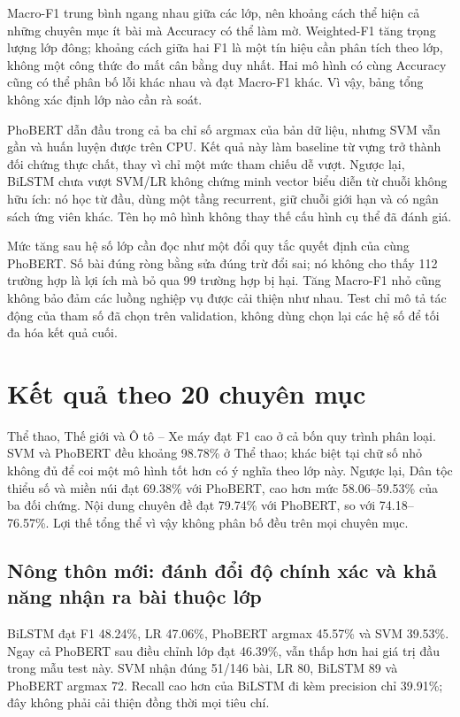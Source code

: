 Macro-F1 trung bình ngang nhau giữa các lớp, nên khoảng cách thể hiện cả những chuyên mục ít bài mà Accuracy có thể làm mờ. Weighted-F1 tăng trọng lượng lớp đông; khoảng cách giữa hai F1 là một tín hiệu cần phân tích theo lớp, không một công thức đo mất cân bằng duy nhất. Hai mô hình có cùng Accuracy cũng có thể phân bố lỗi khác nhau và đạt Macro-F1 khác. Vì vậy, bảng tổng không xác định lớp nào cần rà soát.

PhoBERT dẫn đầu trong cả ba chỉ số argmax của bản dữ liệu, nhưng SVM vẫn gần và huấn luyện được trên CPU. Kết quả này làm baseline từ vựng trở thành đối chứng thực chất, thay vì chỉ một mức tham chiếu dễ vượt. Ngược lại, BiLSTM chưa vượt SVM/LR không chứng minh vector biểu diễn từ chuỗi không hữu ích: nó học từ đầu, dùng một tầng recurrent, giữ chuỗi giới hạn và có ngân sách ứng viên khác. Tên họ mô hình không thay thế cấu hình cụ thể đã đánh giá.

Mức tăng sau hệ số lớp cần đọc như một đổi quy tắc quyết định của cùng PhoBERT. Số bài đúng ròng bằng sửa đúng trừ đổi sai; nó không cho thấy 112 trường hợp là lợi ích mà bỏ qua 99 trường hợp bị hại. Tăng Macro-F1 nhỏ cũng không bảo đảm các luồng nghiệp vụ được cải thiện như nhau. Test chỉ mô tả tác động của tham số đã chọn trên validation, không dùng chọn lại các hệ số để tối đa hóa kết quả cuối.

\FloatBarrier
\section{Kết quả theo 20 chuyên mục}

Thể thao, Thế giới và Ô tô -- Xe máy đạt F1 cao ở cả bốn quy trình phân loại. SVM và PhoBERT đều khoảng 98.78\% ở Thể thao; khác biệt tại chữ số nhỏ không đủ để coi một mô hình tốt hơn có ý nghĩa theo lớp này. Ngược lại, Dân tộc thiểu số và miền núi đạt 69.38\% với PhoBERT, cao hơn mức 58.06--59.53\% của ba đối chứng. Nội dung chuyên đề đạt 79.74\% với PhoBERT, so với 74.18--76.57\%. Lợi thế tổng thể vì vậy không phân bố đều trên mọi chuyên mục.

\subsection{Nông thôn mới: đánh đổi độ chính xác và khả năng nhận ra bài thuộc lớp}
BiLSTM đạt F1 48.24\%, LR 47.06\%, PhoBERT argmax 45.57\% và SVM 39.53\%. Ngay cả PhoBERT sau điều chỉnh lớp đạt 46.39\%, vẫn thấp hơn hai giá trị đầu trong mẫu test này. SVM nhận đúng 51/146 bài, LR 80, BiLSTM 89 và PhoBERT argmax 72. Recall cao hơn của BiLSTM đi kèm precision chỉ 39.91\%; đây không phải cải thiện đồng thời mọi tiêu chí.

